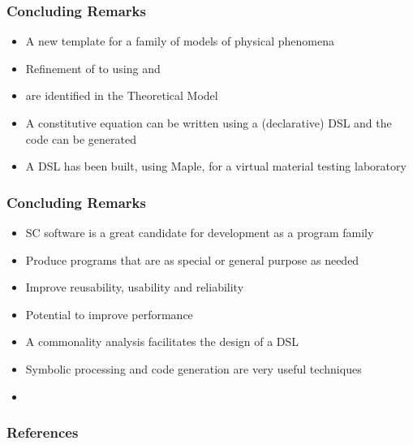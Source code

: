 \documentclass[t,12pt,numbers,fleqn]{beamer}
\newcounter{temp}
\begin{document}

\begin{frame}

\frametitle<presentation>{Concluding Remarks}

\begin{itemize}
\item A new template for a family of models of physical phenomena
\item Refinement of  to  using  and
\item {} are identified in the Theoretical Model
\item A constitutive equation can be written using a (declarative) DSL and the code can be generated
\item A DSL has been built, using Maple, for a virtual material testing laboratory
\end{itemize}
  
\end{frame}


\begin{frame}

\frametitle<presentation>{Concluding Remarks}

\begin{itemize}
\item SC software is a great candidate for development as a program family
\item Produce programs that are as special or general purpose as needed %
\item Improve reusability, usability and reliability
\item Potential to improve performance
\item A commonality analysis facilitates the design of a DSL
\item Symbolic processing and code generation are very useful techniques
\item {}
\end{itemize}
  
\end{frame}


\begin{frame}[allowframebreaks]
\frametitle{References}



\end{frame}

\end{document}
